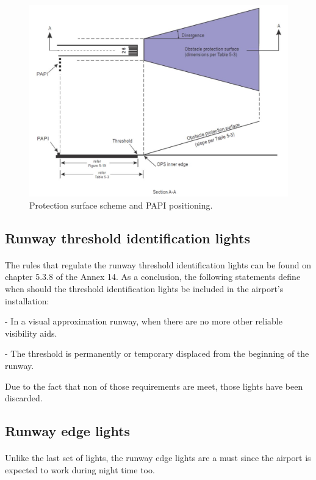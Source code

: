 		\begin{figure}[H]
			\centering
			\includegraphics[clip, trim=0cm 0cm 0cm 0cm, width=1\textwidth]{./images/Annex14/PAPIScheme}
			\caption{Protection surface scheme and PAPI positioning.} %
			\label{} %
		\end{figure}
		
		\subsection{Runway threshold identification lights}
		\paragraph{}The rules that regulate the runway threshold identification lights can be found on chapter 5.3.8 of the Annex 14. As a conclusion, the following statements define when should the threshold identification lights be included in the airport's installation:
		
		- In a visual approximation runway, when there are no more other reliable visibility aids. 
		
		- The threshold is permanently or temporary displaced from the beginning of the runway.
		
		Due to the fact that non of those requirements are meet, those lights have been discarded.
		 
		\subsection{Runway edge lights}
		\paragraph{}Unlike the last set of lights, the runway edge lights are a must since the airport is expected to work during night time too. 
		
